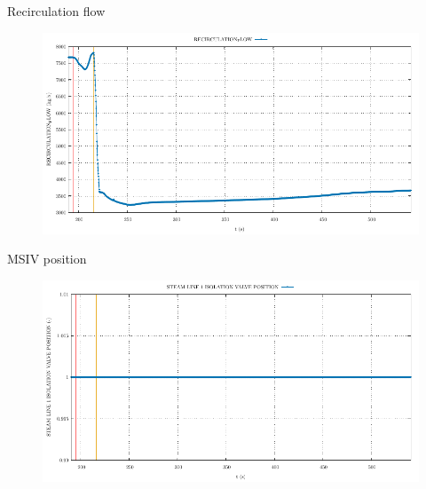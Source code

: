 \begin{frame}{Recirculation flow}
	\begin{figure}
		\centering
		\includegraphics[width=\textwidth]{./graphs/RECIRCULATION_FLOW_comp.pdf}
		
	\end{figure}

\end{frame}


\begin{frame}{MSIV position}
	\begin{figure}
		\centering
		\includegraphics[width=\textwidth]{./graphs/STEAM LINE 1 ISOLATION VALVE POSITION_comp.pdf}
		
	\end{figure}
	
\end{frame}



